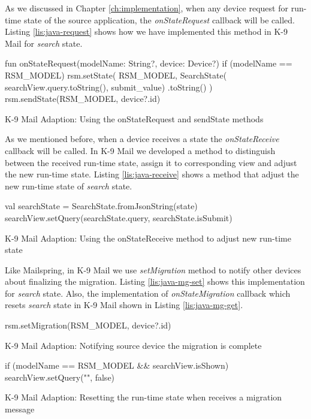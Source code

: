 As we discussed in Chapter \ref{ch:implementation}, when any device request for run-time state of the source application, the \textit{onStateRequest} callback will be called. Listing \ref{lis:java-request} shows how we have implemented this method in K-9 Mail for \textit{search} state. 
  
\FloatBarrier
\begin{code}
\begin{javas}
fun onStateRequest(modelName: String?, device: Device?) {
    if (modelName == RSM_MODEL) {
        rsm.setState(
            RSM_MODEL,
            SearchState(
                searchView.query.toString(),
                submit_value)
            .toString()
        )
        rsm.sendState(RSM_MODEL, device?.id)
    }
}
\end{javas}
\caption{K-9 Mail Adaption: Using the onStateRequest and sendState methods}
\label{lis:java-request}
\end{code}
\FloatBarrier

As we mentioned before, when a device receives a state the \textit{onStateReceive} callback will be called. In K-9 Mail we developed a method to distinguish between the received run-time state, assign it to corresponding view and adjust the new run-time state. Listing \ref{lis:java-receive} shows a method that adjust the new run-time state of \textit{search} state.

\FloatBarrier
\begin{code}
\begin{js2}
val searchState = SearchState.fromJsonString(state)
searchView.setQuery(searchState.query, searchState.isSubmit)
\end{js2}
\caption{K-9 Mail Adaption: Using the onStateReceive method to adjust new run-time state}
\label{lis:java-receive}
\end{code}
\FloatBarrier

Like Mailspring, in K-9 Mail we use \textit{setMigration} method to notify other devices about finalizing the migration. Listing \ref{lis:java-mg-set} shows this implementation for \textit{search} state.
Also,  the implementation of \textit{onStateMigration} callback which resets \textit{search} state in K-9 Mail shown in Listing \ref{lis:java-mg-get}.

\FloatBarrier
\begin{code}
\begin{java}
rsm.setMigration(RSM_MODEL, device?.id)
\end{java}
\caption{K-9 Mail Adaption: Notifying source device the migration is complete}
\label{lis:java-mg-set}
\end{code}
\FloatBarrier

\FloatBarrier
\begin{code}
\begin{java}
if (modelName == RSM_MODEL && searchView.isShown) {
    searchView.setQuery("", false)
}
\end{java}
\caption{K-9 Mail Adaption: Resetting the run-time state when receives a migration message}
\label{lis:java-mg-get}
\end{code}
\FloatBarrier